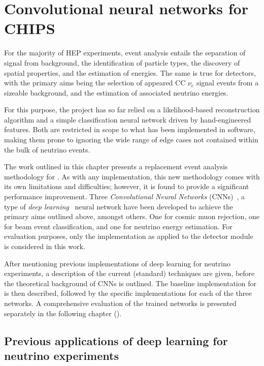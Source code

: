 \chapter{Convolutional neural networks for CHIPS} %
\label{chap:cnn} %

For the majority of HEP experiments, event analysis entails the separation of signal from
background, the identification of particle types, the discovery of spatial properties, and the
estimation of energies. The same is true for \chips detectors, with the primary aims being the
selection of appeared CC $\nu_{e}$ signal events from a sizeable background, and the estimation of
associated neutrino energies.

For this purpose, the \chips project has so far relied on a likelihood-based reconstruction
algorithm and a simple classification neural network driven by hand-engineered features. Both are
restricted in scope to what has been implemented in software, making them prone to ignoring the
wide range of edge cases not contained within the bulk of neutrino events.

The work outlined in this chapter presents a replacement event analysis methodology for \chips. As
with any implementation, this new methodology comes with its own limitations and difficulties;
however, it is found to provide a significant performance improvement. Three \emph{Convolutional
Neural Networks} (CNNs)~\cite{fukushima1982}, a type of \emph{deep learning}~\cite{goodfellow2016}
neural network have been developed to achieve the primary aims outlined above, amongst others. One
for cosmic muon rejection, one for beam event classification, and one for neutrino energy
estimation. For evaluation purposes, only the implementation as applied to the \chipsfive detector
module is considered in this work.

After mentioning previous implementations of deep learning for neutrino experiments, a description
of the current (standard) techniques are given, before the theoretical background of CNNs is
outlined. The baseline implementation for \chips is then described, followed by the specific
implementations for each of the three networks. A comprehensive evaluation of the trained networks
is presented separately in the following chapter ().

\section{Previous applications of deep learning for neutrino experiments} %
\label{sec:cnn_previous} %

